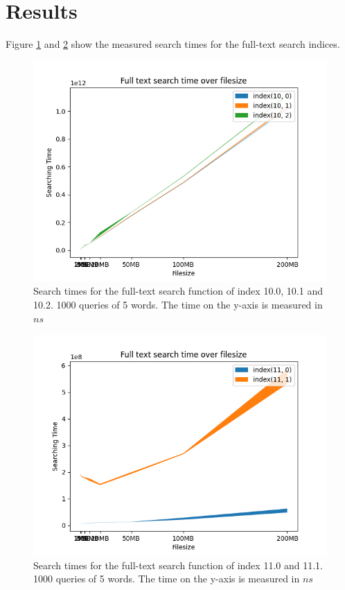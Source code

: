 \section{Results}
Figure \ref{fig:Searchtimefulltext10} and \ref{fig:Searchtimefulltext11} show the measured search times for the full-text search indices.

\begin{figure}[ht!]
    \centering
    \includegraphics[width=.8\textwidth]{LaTeX/Pictures/Results/Fulltext[(10, 0), (10, 1), (10, 2)].png}
    \caption{Search times for the full-text search function of index 10.0, 10.1 and 10.2. 1000 queries of 5 words. The time on the y-axis is measured in $ns$}
    \label{fig:Searchtimefulltext10}
\end{figure}

\begin{figure}[ht!]
    \centering
    \includegraphics[width=.8\textwidth]{LaTeX/Pictures/Results/Fulltext[(11, 0), (11, 1)].png}
    \caption{Search times for the full-text search function of index 11.0 and 11.1. 1000 queries of 5 words. The time on the y-axis is measured in $ns$}
    \label{fig:Searchtimefulltext11}
\end{figure}

